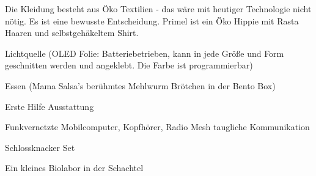 \begin{npcBox}[title=Primel]
    \begin{stressSection}
    \end{stressSection}
    \begin{tabularx}{\textwidth}{ XX }
    \end{tabularx}

    \begin{consequences}
    \item {}
    \item {}
    \item {}
    \end{consequences}

    \begin{npcDescription}
    Die Kleidung besteht aus Öko Textilien - das wäre mit heutiger Technologie nicht nötig. Es ist eine bewusste Entscheidung. Primel ist ein Öko Hippie mit Rasta Haaren und selbstgehäkeltem Shirt.
    \end{npcDescription}


    \begin{equipment}
    \item Lichtquelle (OLED Folie: Batteriebetrieben, kann in jede Größe und Form geschnitten werden und angeklebt. Die Farbe ist programmierbar)
    \item Essen (Mama Salsa's berühmtes Mehlwurm Brötchen in der Bento Box)
    \item Erste Hilfe Ausstattung
    \item Funkvernetzte Mobilcomputer, Kopfhörer, Radio Mesh taugliche Kommunikation
    \item Schlossknacker Set
    \item Ein kleines Biolabor in der Schachtel
    \end{equipment}
\end{npcBox}


